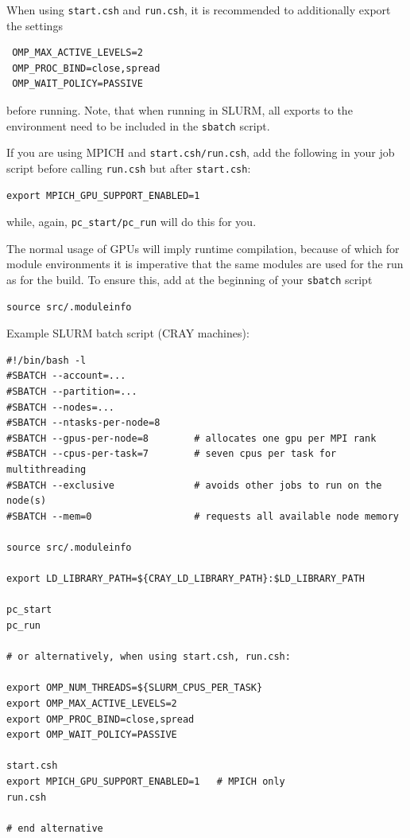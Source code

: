\documentclass[a4paper,12pt]{article}
\newcommand{\command}[1]{\texttt{#1}}
\newcommand{\code}[1]{\texttt{#1}}
\begin{document}
When using \command{start.csh} and \command{run.csh}, it is recommended to additionally export the settings
\begin{verbatim}
 OMP_MAX_ACTIVE_LEVELS=2
 OMP_PROC_BIND=close,spread
 OMP_WAIT_POLICY=PASSIVE
\end{verbatim}
before running.
Note, that when running in SLURM,
all exports to the environment need to be included in the \code{sbatch} script.

If you are using MPICH and \command{start.csh/run.csh}, add the following in your job script before calling \command{run.csh} but after \command{start.csh}:
\begin{verbatim}
export MPICH_GPU_SUPPORT_ENABLED=1
\end{verbatim}
while, again, \code{pc\_start/pc\_run} will do this for you.

The normal usage of GPUs will imply runtime compilation, 
because of which for module environments it is imperative that the same modules are used for the run as for the build.
To ensure this, add at the beginning of your \code{sbatch} script
\begin{verbatim}
source src/.moduleinfo
\end{verbatim}

Example SLURM batch script (CRAY machines):
\begin{verbatim}
#!/bin/bash -l
#SBATCH --account=...
#SBATCH --partition=...
#SBATCH --nodes=...
#SBATCH --ntasks-per-node=8
#SBATCH --gpus-per-node=8        # allocates one gpu per MPI rank 
#SBATCH --cpus-per-task=7        # seven cpus per task for multithreading
#SBATCH --exclusive              # avoids other jobs to run on the node(s)
#SBATCH --mem=0                  # requests all available node memory

source src/.moduleinfo

export LD_LIBRARY_PATH=${CRAY_LD_LIBRARY_PATH}:$LD_LIBRARY_PATH

pc_start
pc_run

# or alternatively, when using start.csh, run.csh:

export OMP_NUM_THREADS=${SLURM_CPUS_PER_TASK}
export OMP_MAX_ACTIVE_LEVELS=2
export OMP_PROC_BIND=close,spread
export OMP_WAIT_POLICY=PASSIVE

start.csh
export MPICH_GPU_SUPPORT_ENABLED=1   # MPICH only
run.csh

# end alternative

\end{verbatim}
\end{document}
